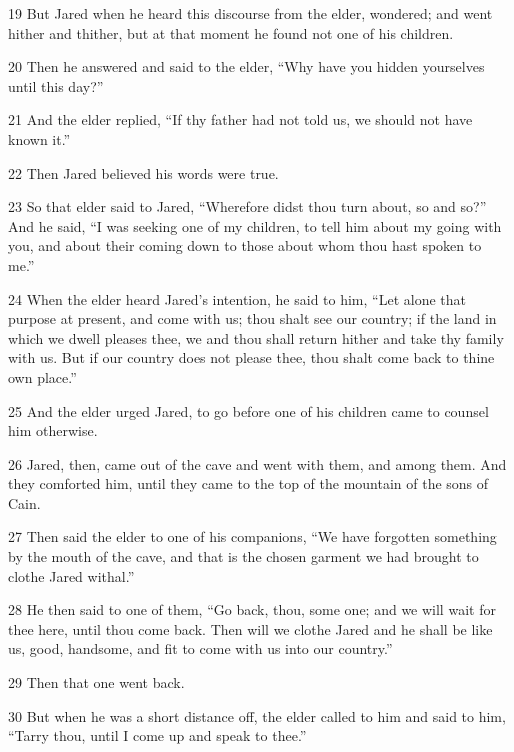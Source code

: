 \par 19 But Jared when he heard this discourse from the elder, wondered; and went hither and thither, but at that moment he found not one of his children.

\par 20 Then he answered and said to the elder, “Why have you hidden yourselves until this day?”

\par 21 And the elder replied, “If thy father had not told us, we should not have known it.”

\par 22 Then Jared believed his words were true.

\par 23 So that elder said to Jared, “Wherefore didst thou turn about, so and so?” And he said, “I was seeking one of my children, to tell him about my going with you, and about their coming down to those about whom thou hast spoken to me.”

\par 24 When the elder heard Jared's intention, he said to him, “Let alone that purpose at present, and come with us; thou shalt see our country; if the land in which we dwell pleases thee, we and thou shall return hither and take thy family with us. But if our country does not please thee, thou shalt come back to thine own place.”

\par 25 And the elder urged Jared, to go before one of his children came to counsel him otherwise.

\par 26 Jared, then, came out of the cave and went with them, and among them. And they comforted him, until they came to the top of the mountain of the sons of Cain.

\par 27 Then said the elder to one of his companions, “We have forgotten something by the mouth of the cave, and that is the chosen garment we had brought to clothe Jared withal.”

\par 28 He then said to one of them, “Go back, thou, some one; and we will wait for thee here, until thou come back. Then will we clothe Jared and he shall be like us, good, handsome, and fit to come with us into our country.”

\par 29 Then that one went back.

\par 30 But when he was a short distance off, the elder called to him and said to him, “Tarry thou, until I come up and speak to thee.”

